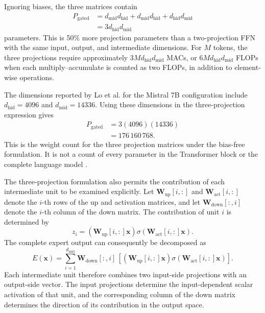 Ignoring biases, the three matrices contain
\begin{align}
    P_{\mathrm{gated}}
    &=
    d_{\mathrm{mid}}d_{\mathrm{hid}}
    +d_{\mathrm{mid}}d_{\mathrm{hid}}
    +d_{\mathrm{hid}}d_{\mathrm{mid}}\\
    &=
    3d_{\mathrm{hid}}d_{\mathrm{mid}}
    \label{eq:ffn-gated-parameters}
\end{align}
parameters. This is 50\% more projection parameters than a two-projection
FFN with the same input, output, and intermediate dimensions. For
\(M\) tokens, the three projections require approximately
\(3M d_{\mathrm{hid}}d_{\mathrm{mid}}\) MACs, or
\(6M d_{\mathrm{hid}}d_{\mathrm{mid}}\) FLOPs when each
multiply--accumulate is counted as two FLOPs, in addition to
element-wise operations.

The dimensions reported by Lo et al. for the Mistral 7B configuration
include \(d_{\mathrm{hid}}=4096\) and \(d_{\mathrm{mid}}=14336\).
Using these dimensions in the three-projection expression gives
\begin{align}
    P_{\mathrm{gated}}
    &=
    3(4096)(14336)\\
    &=
    176\,160\,768.
    \label{eq:ffn-gated-numeric}
\end{align}
This is the weight count for the three projection matrices under the
bias-free formulation. It is not a count of every parameter in the
Transformer block or the complete language model
\parencite{lo2025closer}.

The three-projection formulation also permits the contribution of each
intermediate unit to be examined explicitly. Let
\(\mathbf{W}_{\mathrm{up}}[i,:]\) and
\(\mathbf{W}_{\mathrm{act}}[i,:]\) denote the \(i\)-th rows of the
up and activation matrices, and let
\(\mathbf{W}_{\mathrm{down}}[:,i]\) denote the \(i\)-th column of the
down matrix. The contribution of unit \(i\) is determined by
\begin{equation}
    z_i
    =
    \left(\mathbf{W}_{\mathrm{up}}[i,:]\mathbf{x}\right)
    \sigma\left(\mathbf{W}_{\mathrm{act}}[i,:]\mathbf{x}\right).
    \label{eq:ffn-neuron-activation}
\end{equation}
The complete expert output can consequently be decomposed as
\begin{equation}
    E(\mathbf{x})
    =
    \sum_{i=1}^{d_{\mathrm{mid}}}
    \mathbf{W}_{\mathrm{down}}[:,i]\,
    \left[
        \left(\mathbf{W}_{\mathrm{up}}[i,:]\mathbf{x}\right)
        \sigma\left(\mathbf{W}_{\mathrm{act}}[i,:]\mathbf{x}\right)
    \right].
    \label{eq:ffn-neuron-decomposition}
\end{equation}
Each intermediate unit therefore combines two input-side projections
with an output-side vector. The input projections determine the
input-dependent scalar activation of that unit, and the corresponding
column of the down matrix determines the direction of its contribution
in the output space.

